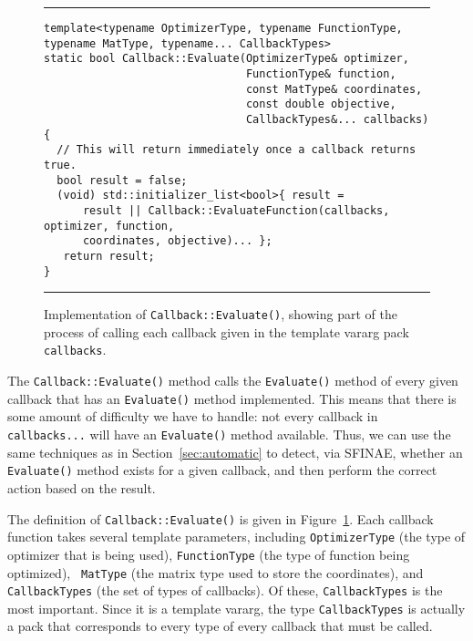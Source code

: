 \begin{figure}[b!]
\hrule
\vspace{1ex}
\begin{verbatim}
template<typename OptimizerType, typename FunctionType, typename MatType, typename... CallbackTypes>
static bool Callback::Evaluate(OptimizerType& optimizer,
                               FunctionType& function,
                               const MatType& coordinates,
                               const double objective,
                               CallbackTypes&... callbacks)
{
  // This will return immediately once a callback returns true.
  bool result = false;
  (void) std::initializer_list<bool>{ result =
      result || Callback::EvaluateFunction(callbacks, optimizer, function,
      coordinates, objective)... };
   return result;
}
\end{verbatim}
\hrule
\vspace*{-0.5em}
\caption{Implementation of {\tt Callback::Evaluate()},
showing part of the process of calling each callback
given in the template vararg pack {\tt callbacks}.
}
\label{fig:callback_evaluate}
\end{figure}

The {\tt Callback::Evaluate()} method calls the {\tt Evaluate()} method of every
given callback that has an {\tt Evaluate()} method implemented.  This means that
there is some amount of difficulty we have to handle: not every callback in {\tt
callbacks...} will have an {\tt Evaluate()} method available.  Thus, we can use
the same techniques as in Section~\ref{sec:automatic} to detect, via SFINAE,
whether an {\tt Evaluate()} method exists for a given callback, and then perform
the correct action based on the result.

The definition of {\tt Callback::Evaluate()} is given in
Figure~\ref{fig:callback_evaluate}.  Each callback function takes several
template parameters, including {\tt OptimizerType} (the type of optimizer that
is being used), {\tt FunctionType} (the type of function being optimized), {\tt
MatType} (the matrix type used to store the coordinates), and {\tt
CallbackTypes} (the set of types of callbacks).  Of these, {\tt CallbackTypes}
is the most important.  Since it is a template vararg, the
type {\tt CallbackTypes} is actually a pack that corresponds to every type of
every callback that must be called.

